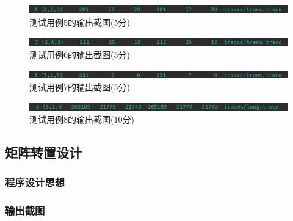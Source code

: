 \begin{figure}[H]
    \centering
    \includegraphics[width=0.7\linewidth]{figures/CSim_5}
    \caption{测试用例5的输出截图(5分)}
    \label{fig:csim5}
\end{figure}

\begin{figure}[H]
    \centering
    \includegraphics[width=0.7\linewidth]{figures/CSim_6}
    \caption{测试用例6的输出截图(5分)}
    \label{fig:csim6}
\end{figure}

\begin{figure}[H]
    \centering
    \includegraphics[width=0.7\linewidth]{figures/CSim_7}
    \caption{测试用例7的输出截图(5分)}
    \label{fig:csim7}
\end{figure}

\begin{figure}[H]
    \centering
    \includegraphics[width=0.7\linewidth]{figures/CSim_8}
    \caption{测试用例8的输出截图(10分)}
    \label{fig:csim8}
\end{figure}

\subsection{矩阵转置设计}


\subsubsection{程序设计思想}

\subsubsection{输出截图}

